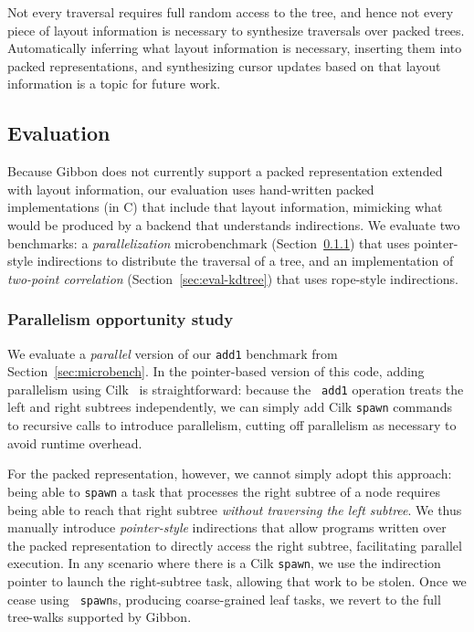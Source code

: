 \documentclass[a4paper,english]{lipics-v2016}
\newcommand{\treelang}{Gibbon\xspace} %
\begin{document}
Not every traversal requires full random access to the tree, and hence not
every piece of layout information is necessary to synthesize traversals over
packed trees.
Automatically inferring what layout information is necessary,
inserting them into packed representations, and synthesizing cursor updates based on that layout information is a topic for future work.


\subsection{Evaluation}%
\label{sec:eval-extensions}

Because \treelang{} does not currently support a packed representation
extended with layout information, our evaluation uses hand-written packed
implementations (in C) that include that layout information, mimicking what
would be produced by a backend that understands indirections. We evaluate two
benchmarks: a {\em parallelization} microbenchmark
(Section~\ref{sec:eval-parallelism}) that uses pointer-style indirections to
distribute the traversal of a tree, and an implementation of {\em two-point
correlation} (Section~\ref{sec:eval-kdtree}) that uses rope-style
indirections.

\subsubsection{Parallelism opportunity study} \label{sec:eval-parallelism}
\label{sec:eval-parallel}

We evaluate a {\em parallel} version of our {\tt add1} benchmark from
Section~\ref{sec:microbench}. In the pointer-based version of this code,
adding parallelism using Cilk~\cite{cilk} is straightforward: because the {\tt
add1} operation treats the left and right subtrees independently, we can
simply add Cilk {\tt spawn} commands to recursive calls to introduce
parallelism, cutting off parallelism as necessary to avoid runtime overhead.

For the packed representation, however, we cannot simply adopt this approach:
being able to {\tt spawn} a task that processes the right subtree of a node
requires being able to reach that right subtree {\em without traversing the
left subtree}. We thus manually introduce {\em pointer-style} indirections
that allow programs written over the packed representation to directly access
the right subtree, facilitating parallel execution. In any scenario where
there is a Cilk {\tt spawn}, we use the indirection pointer to launch the
right-subtree task, allowing that work to be stolen. Once we cease using {\tt
spawn}s, producing coarse-grained leaf tasks, we revert to the full tree-walks
supported by \treelang{}.
\end{document}
